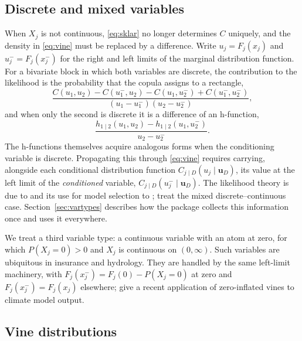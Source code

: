 \documentclass[article]{jss}
\newcommand{\bu}{\bm{u}}
\begin{document}
\subsection{Discrete and mixed variables}\label{sec:discrete-model}

When $X_j$ is not continuous, \eqref{eq:sklar} no longer determines $C$
uniquely, and the density in \eqref{eq:vine} must be replaced by a difference.
Write $u_j = F_j(x_j)$ and $u_j^- = F_j(x_j^-)$ for the right and left limits
of the marginal distribution function.  For a bivariate block in which both
variables are discrete, the contribution to the likelihood is the probability
that the copula assigns to a rectangle,
\begin{equation}\label{eq:pdf-dd}
  \frac{C(u_1, u_2) - C(u_1^-, u_2) - C(u_1, u_2^-) + C(u_1^-, u_2^-)}
       {(u_1 - u_1^-)(u_2 - u_2^-)},
\end{equation}
and when only the second is discrete it is a difference of an h-function,
\begin{equation}\label{eq:pdf-cd}
  \frac{h_{1 \mid 2}(u_1, u_2) - h_{1 \mid 2}(u_1, u_2^-)}{u_2 - u_2^-}.
\end{equation}
The h-functions themselves acquire analogous forms when the conditioning
variable is discrete.  Propagating this through \eqref{eq:vine} requires
carrying, alongside each conditional distribution function
$C_{j \mid D}(u_j \mid \bu_D)$, its value at the left limit of the
\emph{conditioned} variable, $C_{j \mid D}(u_j^- \mid \bu_D)$.  The likelihood theory is due to
\citet{panagiotelis2012} and its use for model selection to
\citet{panagiotelis2017}; \citet{stober2015} treat the mixed
discrete--continuous case.  Section~\ref{sec:vartypes} describes how the
package collects this information once and uses it everywhere.

We treat a third variable type: a continuous variable with an atom at zero, for
which $P(X_j = 0) > 0$ and $X_j$ is continuous on $(0, \infty)$.  Such
variables are ubiquitous in insurance and hydrology.  They are handled by the
same left-limit machinery, with $F_j(x_j^-) = F_j(0) - P(X_j = 0)$ at zero and
$F_j(x_j^-) = F_j(x_j)$ elsewhere; \citet{funk2026} give a recent application
of zero-inflated vines to climate model output.

\subsection{Vine distributions}\label{sec:vinedist-model}
\end{document}
